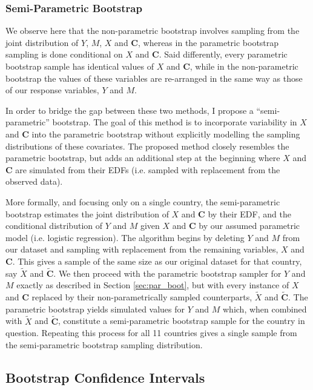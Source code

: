 \documentclass{article}
\newcommand{\C}{\mathbf{C}}
\begin{document}
\subsubsection{Semi-Parametric Bootstrap}

We observe here that the non-parametric bootstrap involves sampling from the joint distribution of $Y$, $M$, $X$ and $\C$, whereas in the parametric bootstrap sampling is done conditional on $X$ and $\C$. Said differently, every parametric bootstrap sample has identical values of $X$ and $\C$, while in the non-parametric bootstrap the values of these variables are re-arranged in the same way as those of our response variables, $Y$ and $M$.

In order to bridge the gap between these two methods, I propose a ``semi-parametric'' bootstrap. The goal of this method is to incorporate variability in $X$ and $\C$ into the parametric bootstrap without explicitly modelling the sampling distributions of these covariates. The proposed method closely resembles the parametric bootstrap, but adds an additional step at the beginning where $X$ and $\C$ are simulated from their EDFs (i.e. sampled with replacement from the observed data). 

More formally, and focusing only on a single country, the semi-parametric bootstrap estimates the joint distribution of $X$ and $\C$ by their EDF, and the conditional distribution of $Y$ and $M$ given $X$ and $\C$ by our assumed parametric model (i.e. logistic regression). The algorithm begins by deleting $Y$ and $M$ from our dataset and sampling with replacement from the remaining variables, $X$ and $\C$. This gives a sample of the same size as our original dataset for that country, say $\tilde{X}$ and $\tilde{\C}$. We then proceed with the parametric bootstrap sampler for $Y$ and $M$ exactly as described in Section \ref{sec:par_boot}, but with every instance of $X$ and $\C$ replaced by their non-parametrically sampled counterparts, $\tilde{X}$ and $\tilde{\C}$. The parametric bootstrap yields simulated values for $Y$ and $M$ which, when combined with $\tilde{X}$ and $\tilde{\C}$, constitute a semi-parametric bootstrap sample for the country in question. Repeating this process for all 11 countries gives a single sample from the semi-parametric bootstrap sampling distribution.


\subsection{Bootstrap Confidence Intervals}
\end{document}
